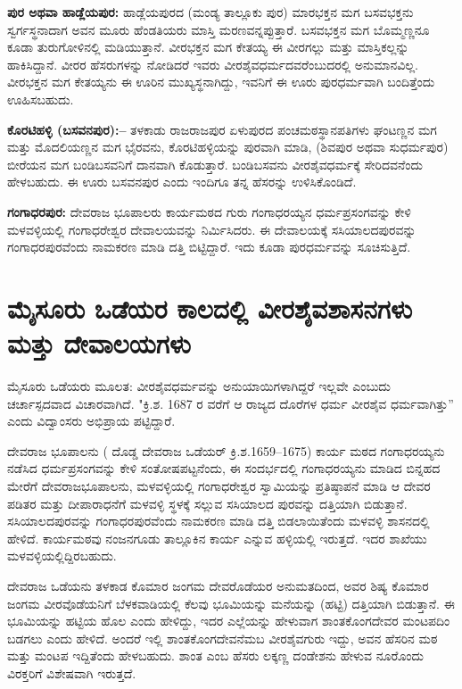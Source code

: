 \textbf{ಪುರ ಅಥವಾ ಹಾಡ್ಲೆಯಪುರ:} ಹಾಡ್ಲೆಯಪುರದ (ಮಂಡ್ಯ ತಾಲ್ಲೂಕು ಪುರ) ಮಾರಭಕ್ತನ ಮಗ ಬಸವಭಕ್ತನು ಸ್ವರ್ಗಸ್ಥನಾದಾಗ ಅವನ ಮೂರು ಹೆಂಡತಿಯರು ಮಾಸ್ತಿ ಮರಣವನ್ನಪ್ಪುತ್ತಾರೆ. ಬಸವಭಕ್ತನ ಮಗ ಬೊಮ್ಮಣ್ಣನೂ ಕೂಡಾ ತುರುಗೋಳಿನಲ್ಲಿ ಮಡಿಯುತ್ತಾನೆ. ವೀರಭಕ್ತನ ಮಗ ಕೇತಯ್ಯ ಈ ವೀರಗಲ್ಲು ಮತ್ತು ಮಾಸ್ತಿಕಲ್ಲನ್ನು ಹಾಕಿಸಿದ್ದಾನೆ. ವೀರರ ಹೆಸರುಗಳನ್ನು ನೋಡಿದರೆ ಇವರು ವೀರಶೈವಧರ್ಮದವರೆಂಬುದರಲ್ಲಿ ಅನುಮಾನವಿಲ್ಲ. ವೀರಭಕ್ತನ ಮಗ ಕೇತಯ್ಯನು ಈ ಊರಿನ ಮುಖ್ಯಸ್ಥನಾಗಿದ್ದು, ಇವನಿಗೆ ಈ ಊರು ಪುರಧರ್ಮವಾಗಿ ಬಂದಿತ್ತೆಂದು ಊಹಿಸಬಹುದು.

\textbf{ಕೊರಟಿಹಳ್ಳಿ (ಬಸವನಪುರ):– }ತಳಕಾಡು ರಾಜರಾಜಪುರ ಏಳುಪುರದ ಪಂಚಮಠಸ್ಥಾನಪತಿಗಳು ಘಂಟಣ್ಣನ ಮಗ ಮತ್ತು ಮೊದಲಿಯಣ್ಣನ ಮಗ ಭೈರವನು, ಕೊರಟಿಹಳ್ಳಿಯನ್ನು ಪುರವಾಗಿ ಮಾಡಿ, (ಶಿವಪುರ ಅಥವಾ ಸುಧರ್ಮಪುರ) ಬೀರೆಯನ ಮಗ ಬಂಡಿಬಸವನಿಗೆ ದಾನವಾಗಿ ಕೊಡುತ್ತಾರೆ. ಬಂಡಿಬಸವನು ವೀರಶೈವಧರ್ಮಕ್ಕೆ ಸೇರಿದವನೆಂದು ಹೇಳಬಹುದು. ಈ ಊರು ಬಸವನಪುರ ಎಂದು ಇಂದಿಗೂ ತನ್ನ ಹೆಸರನ್ನು ಉಳಿಸಿಕೊಂಡಿದೆ.

\textbf{ಗಂಗಾಧರಪುರ:} ದೇವರಾಜ ಭೂಪಾಲರು ಕಾರ್ಯಮಠದ ಗುರು ಗಂಗಾಧರಯ್ಯನ ಧರ್ಮಪ್ರಸಂಗವನ್ನು ಕೇಳಿ ಮಳವಳ್ಳಿಯಲ್ಲಿ ಗಂಗಾಧರೇಶ್ವರ ದೇವಾಲಯವನ್ನು ನಿರ್ಮಿಸಿದರು. ಈ ದೇವಾಲಯಕ್ಕೆ ಸಸಿಯಾಲದಪುರವನ್ನು ಗಂಗಾಧರಪುರವೆಂದು ನಾಮಕರಣ ಮಾಡಿ ದತ್ತಿ ಬಿಟ್ಟಿದ್ದಾರೆ. ಇದು ಕೂಡಾ ಪುರಧರ್ಮವನ್ನು ಸೂಚಿಸುತ್ತಿದೆ.


\section{ಮೈಸೂರು ಒಡೆಯರ ಕಾಲದಲ್ಲಿ ವೀರಶೈವಶಾಸನಗಳು ಮತ್ತು ದೇವಾಲಯಗಳು}

ಮೈಸೂರು ಒಡೆಯರು ಮೂಲತ: ವೀರಶೈವಧರ್ಮವನ್ನು ಅನುಯಾಯಿಗಳಾಗಿದ್ದರೆ ಇಲ್ಲವೇ ಎಂಬುದು ಚರ್ಚಾಸ್ಪದವಾದ ವಿಚಾರವಾಗಿದೆ. "ಕ್ರಿ.ಶ. 1687 ರ ವರೆಗೆ ಆ ರಾಜ್ಯದ ದೊರೆಗಳ ಧರ್ಮ ವೀರಶೈವ ಧರ್ಮವಾಗಿತ್ತು” ಎಂದು ವಿದ್ವಾಂಸರು ಅಭಿಪ್ರಾಯ ಪಟ್ಟಿದ್ದಾರೆ.

ದೇವರಾಜ ಭೂಪಾಲನು ( ದೊಡ್ಡ ದೇವರಾಜ ಒಡೆಯರ್​ ಕ್ರಿ.ಶ.1659–1675) ಕಾರ್ಯ ಮಠದ ಗಂಗಾಧರಯ್ಯನು ನಡೆಸಿದ ಧರ್ಮಪ್ರಸಂಗವನ್ನು ಕೇಳಿ ಸಂತೋಷಪಟ್ಟನೆಂದು, ಈ ಸಂದರ್ಭದಲ್ಲಿ ಗಂಗಾಧರಯ್ಯನು ಮಾಡಿದ ಬಿನ್ನಹದ ಮೇರೆಗೆ ದೇವರಾಜಭೂಪಾಲನು, ಮಳವಳ್ಳಿಯಲ್ಲಿ ಗಂಗಾಧರೇಶ್ವರ ಸ್ವಾಮಿಯನ್ನು ಪ್ರತಿಷ್ಠಾಪನೆ ಮಾಡಿ ಆ ದೇವರ ಪಡಿತರ ಮತ್ತು ದೀಪಾರಾಧನೆಗೆ ಮಳವಳ್ಳಿ ಸ್ಥಳಕ್ಕೆ ಸಲ್ಲುವ ಸಸಿಯಾಲದ ಪುರವನ್ನು ದತ್ತಿಯಾಗಿ ಬಿಡುತ್ತಾನೆ. ಸಸಿಯಾಲದಪುರವನ್ನು ಗಂಗಾಧರಪುರವೆಂದು ನಾಮಕರಣ ಮಾಡಿ ದತ್ತಿ ಬಿಡಲಾಯಿತೆಂದು ಮಳವಳ್ಳಿ ಶಾಸನದಲ್ಲಿ ಹೇಳಿದೆ. ಕಾರ್ಯಮಠವು ನಂಜನಗೂಡು ತಾಲ್ಲೂಕಿನ ಕಾರ್ಯ ಎನ್ನುವ ಹಳ್ಳಿಯಲ್ಲಿ ಇರುತ್ತದೆ. ಇದರ ಶಾಖೆಯು ಮಳವಳ್ಳಿಯಲ್ಲಿದ್ದಿರಬಹುದು.

ದೇವರಾಜ ಒಡೆಯನು ತಳಕಾಡ ಕೊಮಾರ ಜಂಗಮ ದೇವರೊಡೆಯರ ಅನುಮತದಿಂದ, ಅವರ ಶಿಷ್ಯ ಕೊಮಾರ ಜಂಗಮ ವೀರವೊಡೆಯನಿಗೆ ಬೆಳಕವಾಡಿಯಲ್ಲಿ ಕೆಲವು ಭೂಮಿಯನ್ನು ಮನೆಯನ್ನು (ಹಟ್ಟಿ) ದತ್ತಿಯಾಗಿ ಬಿಡುತ್ತಾನೆ. ಈ ಭೂಮಿಯನ್ನು ಹಟ್ಟಿಯ ಹೊಲ ಎಂದು ಹೇಳಿದ್ದು, ಇದರ ಎಲ್ಲೆಯನ್ನು ಹೇಳುವಾಗ ಶಾಂತಕೊಂಗದೇವರ ಮಂಟಪದಿಂ ಬಡಗಲು ಎಂದು ಹೇಳಿದೆ. ಅಂದರೆ ಇಲ್ಲಿ ಶಾಂತಕೊಂಗದೇವನೆಮಬ ವೀರಶೈವಗುರು ಇದ್ದು, ಅವನ ಹೆಸರಿನ ಮಠ ಮತ್ತು ಮಂಟಪ ಇದ್ದಿತೆಂದು ಹೇಳಬಹುದು. ಶಾಂತ ಎಂಬ ಹೆಸರು ಲಕ್ಕಣ್ಣ ದಂಡೇಶನು ಹೇಳುವ ನೂರೊಂದು ವಿರಕ್ತರಿಗೆ ವಿಶೇಷವಾಗಿ ಇರುತ್ತದೆ.

